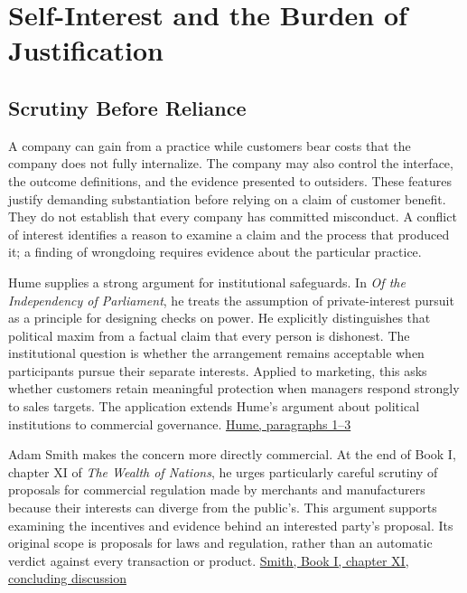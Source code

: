 
\hypertarget{M09-self-interest-and-the-burden-of-justification}{%
\section{Self-Interest and the Burden of
Justification}\label{M09-self-interest-and-the-burden-of-justification}}

\noindent \hypertarget{M09-scrutiny-before-reliance}{%
\subsection{Scrutiny Before
Reliance}\label{M09-scrutiny-before-reliance}}

\noindent \noindent A company can gain from a practice while customers bear costs
that the company does not fully internalize. The company may also
control the interface, the outcome definitions, and the evidence
presented to outsiders. These features justify demanding substantiation
before relying on a claim of customer benefit. They do not establish
that every company has committed misconduct. A conflict of interest
identifies a reason to examine a claim and the process that produced it;
a finding of wrongdoing requires evidence about the particular practice.

Hume supplies a strong argument for institutional safeguards. In
\emph{Of the Independency of Parliament}, he treats the assumption of
private-interest pursuit as a principle for designing checks on power.
He explicitly distinguishes that political maxim from a factual claim
that every person is dishonest. The institutional question is whether
the arrangement remains acceptable when participants pursue their
separate interests. Applied to marketing, this asks whether customers
retain meaningful protection when managers respond strongly to sales
targets. The application extends Hume's argument about political
institutions to commercial governance.
\href{https://davidhume.org/texts/emp/ip}{Hume, paragraphs 1--3}

Adam Smith makes the concern more directly commercial. At the end of
Book I, chapter XI of \emph{The Wealth of Nations}, he urges
particularly careful scrutiny of proposals for commercial regulation
made by merchants and manufacturers because their interests can diverge
from the public's. This argument supports examining the incentives and
evidence behind an interested party's proposal. Its original scope is
proposals for laws and regulation, rather than an automatic verdict
against every transaction or product.
\href{https://www.gutenberg.org/files/3300/3300-h/3300-h.htm}{Smith,
Book I, chapter XI, concluding discussion}

